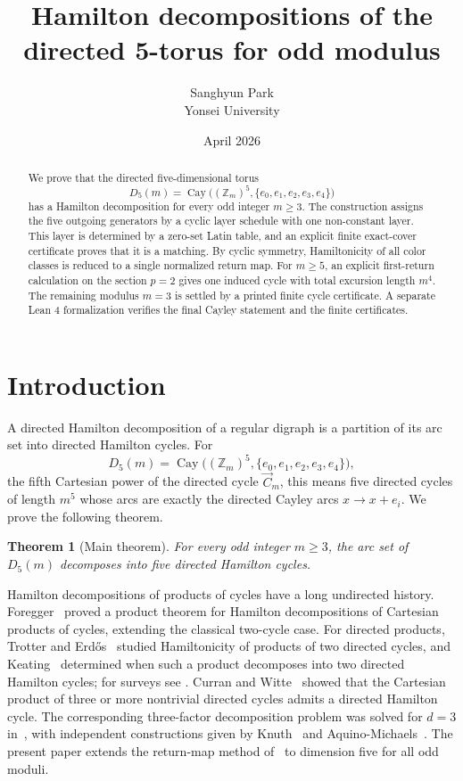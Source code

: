 \documentclass[11pt]{article}
\title{Hamilton decompositions of the directed 5-torus for odd modulus}
\author{Sanghyun Park\\Yonsei University}
\date{April 2026}
\newtheorem{theorem}{Theorem}
\theoremstyle{definition}
\newcommand{\Cay}{\operatorname{Cay}}
\begin{document}
\maketitle

\begin{abstract}
We prove that the directed five-dimensional torus
\[
D_5(m)=\Cay\bigl((\mathbb Z_m)^5,\{e_0,e_1,e_2,e_3,e_4\}\bigr)
\]
has a Hamilton decomposition for every odd integer \(m\ge3\).  The construction assigns the five
outgoing generators by a cyclic layer schedule with one non-constant layer.  This layer is determined
by a zero-set Latin table, and an explicit finite exact-cover certificate proves that it is a matching.
By cyclic symmetry, Hamiltonicity of all color classes is reduced to a single normalized return map.
For \(m\ge5\), an explicit first-return calculation on the section \(p=2\) gives one induced cycle
with total excursion length \(m^4\).  The remaining modulus \(m=3\) is settled by a printed finite
cycle certificate.  A separate Lean 4 formalization verifies the final Cayley statement and the finite
certificates.
\end{abstract}

\section{Introduction}

A directed Hamilton decomposition of a regular digraph is a partition of its arc set into directed
Hamilton cycles.  For
\[
D_5(m)=\Cay\bigl((\mathbb Z_m)^5,\{e_0,e_1,e_2,e_3,e_4\}\bigr),
\]
the fifth Cartesian power of the directed cycle \(\vec C_m\), this means five directed cycles of
length \(m^5\) whose arcs are exactly the directed Cayley arcs \(x\to x+e_i\).  We prove the following
theorem.

\begin{theorem}[Main theorem]\label{thm:intro-main}
For every odd integer \(m\ge3\), the arc set of \(D_5(m)\) decomposes into five directed Hamilton
cycles.
\end{theorem}

Hamilton decompositions of products of cycles have a long undirected history.  Foregger~\cite{Foregger1978}
proved a product theorem for Hamilton decompositions of Cartesian products of cycles, extending the
classical two-cycle case.  For directed products, Trotter and Erd\H{o}s~\cite{TrotterErdos1978}
studied Hamiltonicity of products of two directed cycles, and Keating~\cite{Keating1985} determined
when such a product decomposes into two directed Hamilton cycles; for surveys see
\cite{WitteGallian1984,CurranGallian1996,AlspachBermondSotteau1990}.  Curran and
Witte~\cite{CurranWitte1985} showed that the Cartesian product of three or more nontrivial directed
cycles admits a directed Hamilton cycle.  The corresponding three-factor decomposition problem was
solved for \(d=3\) in~\cite{d3torus}, with independent constructions given by
Knuth~\cite{Knuth2026} and Aquino-Michaels~\cite{AquinoMichaels2026}.  The present paper extends the
return-map method of~\cite{d3torus} to dimension five for all odd moduli.
\end{document}
